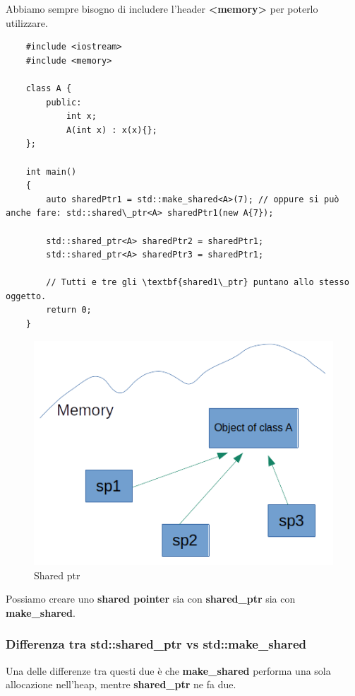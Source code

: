 \textsf{\small Abbiamo sempre bisogno di includere l'header \textbf{<memory>} per poterlo utilizzare.} \break

\begin{lstlisting}
	#include <iostream>
	#include <memory>
	
	class A {
		public:
			int x;
			A(int x) : x(x){};
	};

	int main()
	{
		auto sharedPtr1 = std::make_shared<A>(7); // oppure si può anche fare: std::shared\_ptr<A> sharedPtr1(new A{7});
		
		std::shared_ptr<A> sharedPtr2 = sharedPtr1;
		std::shared_ptr<A> sharedPtr3 = sharedPtr1;
		
		// Tutti e tre gli \textbf{shared1\_ptr} puntano allo stesso oggetto.
		return 0;
	}
\end{lstlisting}

\begin{figure}[H]
	\centering
	\includegraphics[width=1\textwidth, height=1\textheight, keepaspectratio]{./imgs/shared_ptr3.png}
	\caption{Shared ptr}
	\label{fig:shared_ptr3}
\end{figure}

\textsf{\small Possiamo creare uno \textbf{shared pointer} sia con \textbf{shared\_ptr} sia con \textbf{make\_shared}.} \\

\subsubsection{Differenza tra std::shared\_ptr vs std::make\_shared}

\textsf{\small Una delle differenze tra questi due è che \textbf{make\_shared} performa una sola allocazione nell'heap, mentre \textbf{shared\_ptr} ne fa due.} \\


